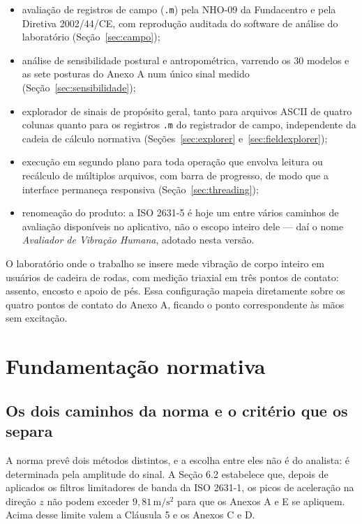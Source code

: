 \documentclass[11pt,a4paper]{article}
\newcommand{\code}[1]{\texttt{\small #1}}
\newcommand{\unit}[2]{\ensuremath{#1\,\mathrm{#2}}}
\begin{document}
\begin{itemize}
  \item avaliação de registros de campo (\code{.m}) pela NHO-09 da Fundacentro
        e pela Diretiva 2002/44/CE, com reprodução auditada do software de
        análise do laboratório (Seção~\ref{sec:campo});
  \item análise de sensibilidade postural e antropométrica, varrendo os 30
        modelos e as sete posturas do Anexo A num único sinal medido
        (Seção~\ref{sec:sensibilidade});
  \item explorador de sinais de propósito geral, tanto para arquivos ASCII de
        quatro colunas quanto para os registros \code{.m} do registrador de
        campo, independente da cadeia de cálculo normativa
        (Seções~\ref{sec:explorer} e~\ref{sec:fieldexplorer});
  \item execução em segundo plano para toda operação que envolva leitura ou
        recálculo de múltiplos arquivos, com barra de progresso, de modo que a
        interface permaneça responsiva (Seção~\ref{sec:threading});
  \item renomeação do produto: a ISO 2631-5 é hoje um entre vários caminhos de
        avaliação disponíveis no aplicativo, não o escopo inteiro dele --- daí
        o nome \emph{Avaliador de Vibração Humana}, adotado nesta versão.
\end{itemize}

O laboratório onde o trabalho se insere mede vibração de corpo inteiro em
usuários de cadeira de rodas, com medição triaxial em três pontos de contato:
assento, encosto e apoio de pés. Essa configuração mapeia diretamente sobre os
quatro pontos de contato do Anexo A, ficando o ponto correspondente às mãos sem
excitação.

\section{Fundamentação normativa}

\subsection{Os dois caminhos da norma e o critério que os separa}
\label{sec:validade}

A norma prevê dois métodos distintos, e a escolha entre eles não é do analista:
é determinada pela amplitude do sinal. A Seção 6.2 estabelece que, depois de
aplicados os filtros limitadores de banda da ISO 2631-1, os picos de aceleração
na direção $z$ não podem exceder \unit{9{,}81}{m/s^2} para que os Anexos A e E
se apliquem. Acima desse limite valem a Cláusula 5 e os Anexos C e D.
\end{document}
